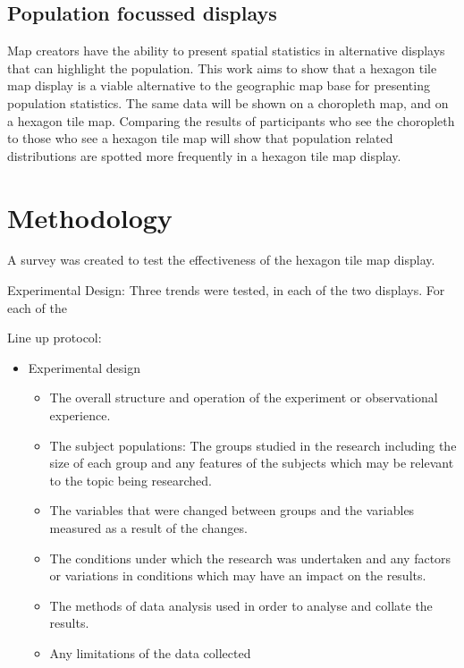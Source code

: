\documentclass[conference,final,]{IEEEtran}
\providecommand{\tightlist}{%
  \setlength{\itemsep}{0pt}\setlength{\parskip}{0pt}}
\begin{document}
\hypertarget{population-focussed-displays}{%
\subsection{Population focussed
displays}\label{population-focussed-displays}}

Map creators have the ability to present spatial statistics in
alternative displays that can highlight the population. This work aims
to show that a hexagon tile map display is a viable alternative to the
geographic map base for presenting population statistics. The same data
will be shown on a choropleth map, and on a hexagon tile map. Comparing
the results of participants who see the choropleth to those who see a
hexagon tile map will show that population related distributions are
spotted more frequently in a hexagon tile map display.

\hypertarget{methodology}{%
\section{Methodology}\label{methodology}}

A survey was created to test the effectiveness of the hexagon tile map
display.

Experimental Design: Three trends were tested, in each of the two
displays. For each of the

Line up protocol:

\begin{itemize}
\item
  Experimental design

  \begin{itemize}
  \tightlist
  \item
    The overall structure and operation of the experiment or
    observational experience.
  \item
    The subject populations: The groups studied in the research
    including the size of each group and any features of the subjects
    which may be relevant to the topic being researched.
  \item
    The variables that were changed between groups and the variables
    measured as a result of the changes.
  \item
    The conditions under which the research was undertaken and any
    factors or variations in conditions which may have an impact on the
    results.
  \item
    The methods of data analysis used in order to analyse and collate
    the results.
  \item
    Any limitations of the data collected
  \end{itemize}
\end{itemize}
\end{document}
